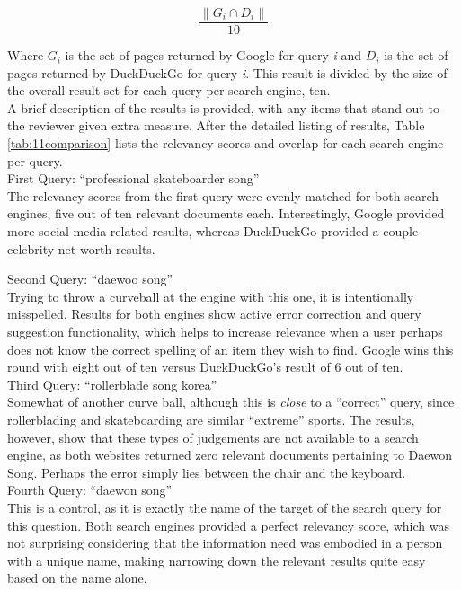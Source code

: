 \[ \frac{\| G_i \cap D_i \|}{ 10 }\]

Where \(G_i\) is the set of pages returned by Google for query \textit{i} and \(D_i\) is the set of pages returned by DuckDuckGo for query \textit{i}.  This result is divided by the size of the overall result set for each query per search engine, ten.\\

A brief description of the results is provided, with any items that stand out to the reviewer given extra measure.  After the detailed listing of results, Table \ref{tab:11comparison} lists the relevancy scores and overlap for each search engine per query.\\


First Query: ``professional skateboarder song''\\

The relevancy scores from the first query were evenly matched for both search engines, five out of ten relevant documents each.  Interestingly, Google provided more social media related results, whereas DuckDuckGo provided a couple celebrity net worth results.\\

\clearpage

Second Query: ``daewoo song''\\

Trying to throw a curveball at the engine with this one, it is intentionally misspelled.  Results for both engines show active error correction and query suggestion functionality, which helps to increase relevance when a user perhaps does not know the correct spelling of an item they wish to find.  Google wins this round with eight out of ten versus DuckDuckGo's result of 6 out of ten.\\


Third Query: ``rollerblade song korea''\\

Somewhat of another curve ball, although this is \textit{close} to a ``correct'' query, since rollerblading and skateboarding are similar ``extreme'' sports.  The results, however, show that these types of judgements are not available to a search engine, as both websites returned zero relevant documents pertaining to Daewon Song.  Perhaps the error simply lies between the chair and the keyboard.\\

Fourth Query: ``daewon song''\\

This is a control, as it is exactly the name of the target of the search query for this question.  Both search engines provided a perfect relevancy score, which was not surprising considering that the information need was embodied in a person with a unique name, making narrowing down the relevant results quite easy based on the name alone.


